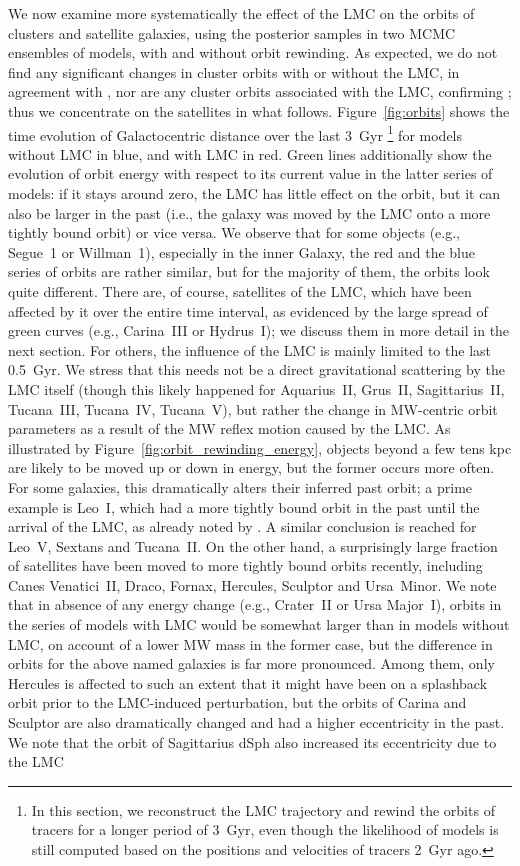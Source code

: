 \documentclass[usenatbib,fleqn]{mnras}
\begin{document}
We now examine more systematically the effect of the LMC on the orbits of clusters and satellite galaxies, using the posterior samples in two MCMC ensembles of models, with and without orbit rewinding. As expected, we do not find any significant changes in cluster orbits with or without the LMC, in agreement with \citet{Garrow2020}, nor are any cluster orbits associated with the LMC, confirming \citet{Boldrini2021}; thus we concentrate on the satellites in what follows. Figure~\ref{fig:orbits} shows the time evolution of Galactocentric distance over the last 3~Gyr%
\footnote{In this section, we reconstruct the LMC trajectory and rewind the orbits of tracers for a longer period of 3~Gyr, even though the likelihood of models is still computed based on the positions and velocities of tracers 2~Gyr ago.}
for models without LMC in blue, and with LMC in red. Green lines additionally show the evolution of orbit energy with respect to its current value in the latter series of models: if it stays around zero, the LMC has little effect on the orbit, but it can also be larger in the past (i.e., the galaxy was moved by the LMC onto a more tightly bound orbit) or vice versa. We observe that for some objects (e.g., Segue~1 or Willman~1), especially in the inner Galaxy, the red and the blue series of orbits are rather similar, but for the majority of them, the orbits look quite different. There are, of course, satellites of the LMC, which have been affected by it over the entire time interval, as evidenced by the large spread of green curves (e.g., Carina~III or Hydrus~I); we discuss them in more detail in the next section. For others, the influence of the LMC is mainly limited to the last 0.5~Gyr. We stress that this needs not be a direct gravitational scattering by the LMC itself (though this likely happened for Aquarius~II, Grus~II, Sagittarius~II, Tucana~III, Tucana~IV, Tucana~V), but rather the change in MW-centric orbit parameters as a result of the MW reflex motion caused by the LMC. As illustrated by Figure~\ref{fig:orbit_rewinding_energy}, objects beyond a few tens kpc are likely to be moved up or down in energy, but the former occurs more often. For some galaxies, this dramatically alters their inferred past orbit; a prime example is Leo~I, which had a more tightly bound orbit in the past until the arrival of the LMC, as already noted by \citet[their section 3.2]{Erkal2020b}. A similar conclusion is reached for Leo~V, Sextans and Tucana~II. On the other hand, a surprisingly large fraction of satellites have been moved to more tightly bound orbits recently, including Canes Venatici~II, Draco, Fornax, Hercules, Sculptor and Ursa~Minor. We note that in absence of any energy change (e.g., Crater~II or Ursa Major~I), orbits in the series of models with LMC would be somewhat larger than in models without LMC, on account of a lower MW mass in the former case, but the difference in orbits for the above named galaxies is far more pronounced. Among them, only Hercules is affected to such an extent that it might have been on a splashback orbit prior to the LMC-induced perturbation, but the orbits of Carina and Sculptor are also dramatically changed and had a higher eccentricity in the past. We note that the orbit of Sagittarius dSph also increased its eccentricity due to the LMC 
\end{document}
